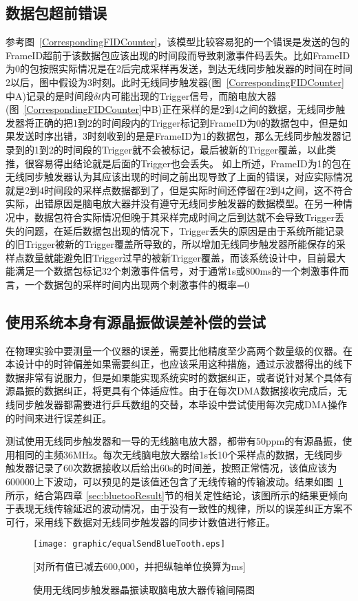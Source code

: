 \subsection{数据包超前错误}
	参考图~\ref{CorrespondingFIDCounter}，该模型比较容易犯的一个错误是发送的包的FrameID超前于该数据包应该出现的时间段而导致刺激事件码丢失。比如FrameID为0的包按照实际情况是在{\textcircled{\small{2}}}后完成采样再发送，到达无线同步触发器的时间在时间{\textcircled{\small{2}}}以后，图中假设为{\textcircled{\small{3}}}时刻。此时无线同步触发器(图~\ref{CorrespondingFIDCounter} 中A)记录的是时间段$\delta t$内可能出现的Trigger信号，而脑电放大器(图~\ref{CorrespondingFIDCounter}中B)正在采样的是{\textcircled{\small{2}}}到{\textcircled{\small{4}}}之间的数据，无线同步触发器将正确的把{\textcircled{\small{1}}}到{\textcircled{\small{2}}}的时间段内的Trigger标记到FrameID为0的数据包中，但是如果发送时序出错，{\textcircled{\small{3}}}时刻收到的是是FrameID为1的数据包，那么无线同步触发器记录到的{\textcircled{\small{1}}}到{\textcircled{\small{2}}}的时间段的Trigger就不会被标记，最后被新的Trigger覆盖，以此类推，很容易得出结论就是后面的Trigger也会丢失。
	如上所述，FrameID为1的包在无线同步触发器认为其应该出现的时间之前出现导致了上面的错误，对应实际情况就是{\textcircled{\small{2}}}到{\textcircled{\small{4}}}时间段的采样点数据都到了，但是实际时间还停留在{\textcircled{\small{2}}}到{\textcircled{\small{4}}}之间，这不符合实际，出错原因是脑电放大器并没有遵守无线同步触发器的数据模型。在另一种情况中，数据包符合实际情况但晚于其采样完成时间之后到达就不会导致Trigger丢失的问题，在延后数据包出现的情况下，Trigger丢失的原因是由于系统所能记录的旧Trigger被新的Trigger覆盖所导致的，所以增加无线同步触发器所能保存的采样点数量就能避免旧Trigger过早的被新Trigger覆盖，而该系统设计中，目前最大能满足一个数据包标记32个刺激事件信号，对于通常1s或800ms的一个刺激事件而言，一个数据包的采样时间内出现两个刺激事件的概率=0

\subsection{使用系统本身有源晶振做误差补偿的尝试}

	在物理实验中要测量一个仪器的误差，需要比他精度至少高两个数量级的仪器。在本设计中的时钟偏差如果需要纠正，也应该采用这种措施，通过示波器得出的线下数据非常有说服力，但是如果能实现系统实时的数据纠正，或者说针对某个具体有源晶振的数据纠正，将更具有个体适应性。由于在每次DMA数据接收完成后，无线同步触发器都需要进行乒乓数组的交替，本毕设中尝试使用每次完成DMA操作的时间来进行误差纠正。

	测试使用无线同步触发器和一导的无线脑电放大器，都带有50ppm的有源晶振，使用相同的主频36MHz。每次无线脑电放大器给1s长10个采样点的数据，无线同步触发器记录了60次数据接收以后给出60s的时间差，按照正常情况，该值应该为600000上下波动，可以预见的是该值还包含了无线传输的传输波动。结果如图~\ref{WirelessTriggerCalDelay} 所示，结合第四章 \ref{sec:bluetooResult}节的相关定性结论，该图所示的结果更倾向于表现无线传输延迟的波动情况，由于没有一致性的规律，所以的误差纠正方案不可行，采用线下数据对无线同步触发器的同步计数值进行修正。


\begin{figure}[!hbp]
\begin{center}
\texttt{[image: graphic/equalSendBlueTooth.eps]}
\caption{使用无线同步触发器晶振读取脑电放大器传输间隔图 \label{WirelessTriggerCalDelay}}
[对所有值已减去600,000，并把纵轴单位换算为ms]
\end{center}
\end{figure}


